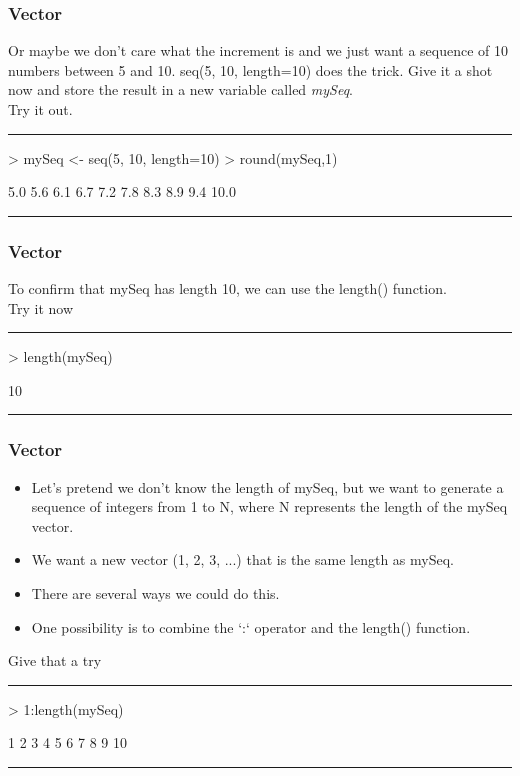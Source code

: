 \documentclass{beamer}
\begin{document}
\begin{frame}[fragile]
	\frametitle{Vector}
	Or maybe we don't care what the increment is and we just want a sequence of 10 numbers between 5 and 10. seq(5, 10, length=10) does the trick. Give it a shot now and store the result in a new variable called \textit{mySeq}.\\
	\centering Try it out.\\
	\pause
\rule{\textwidth}{0.4pt}
\begin{Schunk}
\begin{Sinput}
> mySeq <- seq(5, 10, length=10)
> round(mySeq,1)
\end{Sinput}
\begin{Soutput}
 [1]  5.0  5.6  6.1  6.7  7.2  7.8  8.3  8.9  9.4 10.0
\end{Soutput}
\end{Schunk}
  \rule{\textwidth}{0.4pt}
\end{frame}

\begin{frame}[fragile]
\frametitle{Vector}
To confirm that mySeq has length 10, we can use the length() function.\\
\centering Try it now\\
\pause
\rule{\textwidth}{0.4pt}
\begin{Schunk}
\begin{Sinput}
> length(mySeq)
\end{Sinput}
\begin{Soutput}
[1] 10
\end{Soutput}
\end{Schunk}
  \rule{\textwidth}{0.4pt}
\end{frame}

\begin{frame}[fragile]
	\frametitle{Vector}
	\begin{itemize}
  	\item Let's pretend we don't know the length of mySeq, but we want to generate a sequence of integers from 1 to N, where N represents the length of the mySeq vector.
  	\item We want a new vector (1, 2, 3, ...) that is the same length as mySeq.
  	\item There are several ways we could do this. 
  	\item One possibility is to combine the `:` operator and the length() function.
	\end{itemize}
	\centering Give that a try
	\pause
\rule{\textwidth}{0.4pt}
\begin{Schunk}
\begin{Sinput}
> 1:length(mySeq)
\end{Sinput}
\begin{Soutput}
 [1]  1  2  3  4  5  6  7  8  9 10
\end{Soutput}
\end{Schunk}
\rule{\textwidth}{0.4pt}
\end{frame}
\end{document}
